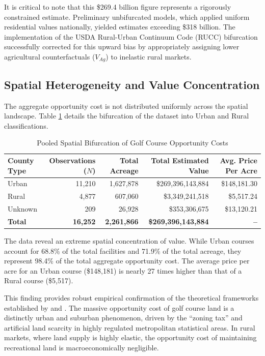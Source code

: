 \documentclass[10pt, letterpaper]{article}
\begin{document}
It is critical to note that this \$269.4 billion figure represents a rigorously constrained estimate. Preliminary unbifurcated models, which applied uniform residential values nationally, yielded estimates exceeding \$318 billion. The implementation of the USDA Rural-Urban Continuum Code (RUCC) bifurcation successfully corrected for this upward bias by appropriately assigning lower agricultural counterfactuals ($V_{Ag}$) to inelastic rural markets.

\subsection{Spatial Heterogeneity and Value Concentration}
The aggregate opportunity cost is not distributed uniformly across the spatial landscape. Table \ref{tab:bifurcation} details the bifurcation of the dataset into Urban and Rural classifications.

\begin{table}[h!]
\centering
\caption{Pooled Spatial Bifurcation of Golf Course Opportunity Costs}
\label{tab:bifurcation}
\renewcommand{\arraystretch}{1.2}
\begin{tabular}{l r r r r}
\hline
\textbf{County Type} & \textbf{Observations ($N$)} & \textbf{Total Acreage} & \textbf{Total Estimated Value} & \textbf{Avg. Price Per Acre} \\
\hline
Urban & 11,210 & 1,627,878 & \$269,396,143,884 & \$148,181.30 \\
Rural & 4,877 & 607,060 & \$3,349,241,518 & \$5,517.24 \\
Unknown & 209 & 26,928 & \$353,306,675 & \$13,120.21 \\
\hline
\textbf{Total} & \textbf{16,252} & \textbf{2,261,866} & \textbf{\$269,396,143,884} & \textbf{--} \\
\hline
\end{tabular}
\end{table}

The data reveal an extreme spatial concentration of value. While Urban courses account for 68.8\% of the total facilities and 71.9\% of the total acreage, they represent 98.4\% of the total aggregate opportunity cost. The average price per acre for an Urban course (\$148,181) is nearly 27 times higher than that of a Rural course (\$5,517). 

This finding provides robust empirical confirmation of the theoretical frameworks established by \textcite{Davis2021} and \textcite{Glaeser2005}. The massive opportunity cost of golf course land is a distinctly urban and suburban phenomenon, driven by the ``zoning tax'' and artificial land scarcity in highly regulated metropolitan statistical areas. In rural markets, where land supply is highly elastic, the opportunity cost of maintaining recreational land is macroeconomically negligible.
\end{document}
